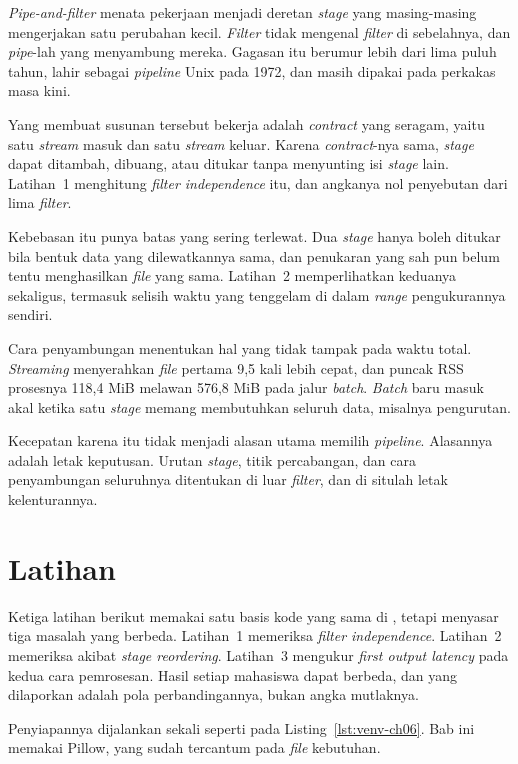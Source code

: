 \textit{Pipe-and-filter} menata pekerjaan menjadi deretan \textit{stage} yang
masing-masing mengerjakan satu perubahan kecil. \textit{Filter} tidak mengenal
\textit{filter} di sebelahnya, dan \textit{pipe}-lah yang menyambung mereka. Gagasan itu berumur
lebih dari lima puluh tahun, lahir sebagai \textit{pipeline} Unix pada 1972, dan
masih dipakai pada perkakas masa kini.

Yang membuat susunan tersebut bekerja adalah \textit{contract} yang seragam,
yaitu satu \textit{stream} masuk dan satu \textit{stream} keluar. Karena
\textit{contract}-nya sama, \textit{stage} dapat ditambah, dibuang, atau ditukar
tanpa menyunting isi \textit{stage} lain. Latihan~1 menghitung
\textit{filter independence} itu, dan angkanya nol penyebutan dari lima
\textit{filter}.

Kebebasan itu punya batas yang sering terlewat. Dua \textit{stage} hanya boleh
ditukar bila bentuk data yang dilewatkannya sama, dan penukaran yang sah pun
belum tentu menghasilkan \textit{file} yang sama. Latihan~2 memperlihatkan
keduanya sekaligus, termasuk selisih waktu yang tenggelam di dalam
\textit{range} pengukurannya sendiri.

Cara penyambungan menentukan hal yang tidak tampak pada waktu total.
\textit{Streaming} menyerahkan \textit{file} pertama 9,5 kali lebih cepat, dan
puncak RSS prosesnya 118,4 MiB melawan 576,8 MiB pada jalur \textit{batch}.
\textit{Batch} baru masuk akal ketika satu \textit{stage} memang membutuhkan
seluruh data, misalnya pengurutan.

Kecepatan karena itu tidak menjadi alasan utama memilih \textit{pipeline}. Alasannya
adalah letak keputusan. Urutan \textit{stage}, titik
percabangan, dan cara penyambungan seluruhnya ditentukan di luar \textit{filter}, dan
di situlah letak kelenturannya.

\section{Latihan}

Ketiga latihan berikut memakai satu basis kode yang sama di
, tetapi menyasar tiga masalah yang berbeda.
Latihan~1 memeriksa \textit{filter independence}. Latihan~2 memeriksa akibat
\textit{stage reordering}. Latihan~3 mengukur \textit{first output latency} pada
kedua cara pemrosesan. Hasil setiap mahasiswa dapat berbeda, dan yang dilaporkan adalah pola
perbandingannya, bukan angka mutlaknya.

Penyiapannya dijalankan sekali seperti pada Listing~\ref{lst:venv-ch06}. Bab ini
memakai Pillow, yang sudah tercantum pada \textit{file} kebutuhan.

